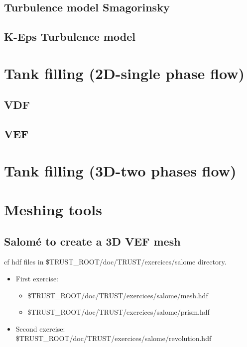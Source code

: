 \documentclass[english]{article}
\begin{document}
\subsection{Turbulence model Smagorinsky}

\subsection{K-Eps Turbulence model}


\section{Tank filling (2D-single phase flow)}
\subsection{VDF}

\subsection{VEF}


\section{Tank filling (3D-two phases flow)}


\newpage
\section{Meshing tools}
\subsection{Salom\'e to create a 3D VEF mesh}
cf hdf files in \$TRUST\_ROOT/doc/TRUST/exercices/salome directory.
\begin{itemize}
\item First exercise:
\begin{itemize}
\item \$TRUST\_ROOT/doc/TRUST/exercices/salome/mesh.hdf
\item \$TRUST\_ROOT/doc/TRUST/exercices/salome/prism.hdf
\end{itemize}
\item Second exercise:\\
\$TRUST\_ROOT/doc/TRUST/exercices/salome/revolution.hdf
\end{itemize}
\end{document}
